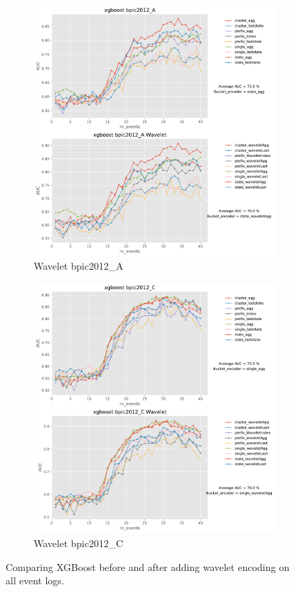 \begin{figure}[!htbp]
	\medskip
	\begin{subfigure}{0.48\textwidth}
		\includegraphics[width=\linewidth]{images/wavelet/graphs2/bpic2012_A.pdf}
		\caption{Wavelet bpic2012\_A} \label{fig:b12aw}
	\end{subfigure}\hspace*{\fill}
	\begin{subfigure}{0.48\textwidth}
		\includegraphics[width=\linewidth]{images/wavelet/graphs2/bpic2012_C.pdf}
		\caption{Wavelet bpic2012\_C} \label{fig:b12cw}
	\end{subfigure}	
\caption{Comparing XGBoost before and after adding wavelet encoding on all event logs.}
\label{fig:r1w}
\end{figure}



